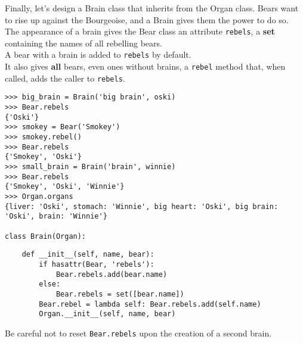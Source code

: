 \begin{blocksection}
\question Finally, let's design a Brain class that inherits from the Organ class.
Bears want to rise up against the Bourgeoise, and a Brain gives them the power to do so.
\\The appearance of a brain gives the Bear class an attribute \lstinline{rebels}, a \textbf{set} containing the names of all rebelling bears.
\\A bear with a brain is added to \lstinline{rebels} by default.
\\It also gives \textbf{all} bears, even ones without brains, a \lstinline{rebel} method that, when called, adds the caller to \lstinline{rebels}.

\vspace{1\baselineskip}
\begin{lstlisting}
>>> big_brain = Brain('big brain', oski)
>>> Bear.rebels
{'Oski'}
>>> smokey = Bear('Smokey')
>>> smokey.rebel()
>>> Bear.rebels
{'Smokey', 'Oski'}
>>> small_brain = Brain('brain', winnie)
>>> Bear.rebels
{'Smokey', 'Oski', 'Winnie'}
>>> Organ.organs
{liver: 'Oski', stomach: 'Winnie', big heart: 'Oski', big brain: 'Oski', brain: 'Winnie'}

class Brain(Organ):
\end{lstlisting}

\begin{nonsol}
\vspace{7\baselineskip}
\end{nonsol}

\begin{solution}
  \vspace{-0.5\baselineskip}
\begin{lstlisting}
    def __init__(self, name, bear):
        if hasattr(Bear, 'rebels'):
            Bear.rebels.add(bear.name)
        else:
            Bear.rebels = set([bear.name])
        Bear.rebel = lambda self: Bear.rebels.add(self.name)
        Organ.__init__(self, name, bear)
\end{lstlisting}

Be careful not to reset \lstinline{Bear.rebels} upon the creation of a second brain.
\end{solution}
\end{blocksection}
